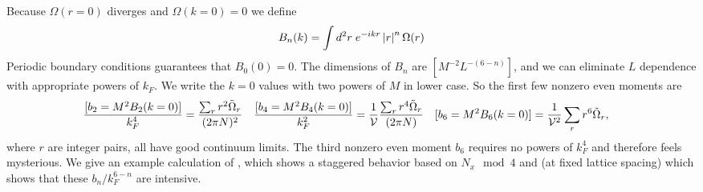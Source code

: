 Because $\Omega(r=0)$ diverges and $\Omega(k=0)=0$ we define
\begin{align}
	B_n(k) = \int d^2r\; e^{-i k r} \left| r \right|^n \Omega(r) 
\end{align}
Periodic boundary conditions guarantees that $B_0(0) = 0$.
The dimensions of $B_n$ are $[M^{-2} L^{-(6-n)}]$, and we can eliminate $L$ dependence with appropriate powers of $k_F$.
We write the $k=0$ values with two powers of $M$ in lower case.
So the first few nonzero even moments are
\begin{align}
	\frac{[b_2 = M^2 B_2(k=0)]}{k_F^4} &= \frac{\sum_r r^2 \tilde{\Omega}_r}{(2\pi N)^2}
	&
	\frac{[b_4 = M^2 B_4(k=0)]}{k_F^2} &= \frac{1}{\mathcal{V}} \frac{\sum_r r^4 \tilde{\Omega}_r}{(2\pi N)}
	&
	[b_6 = M^2 B_6(k=0)] &= \frac{1}{\mathcal{V}^2}\sum_r r^6 \tilde{\Omega}_r,
	\label{eq:voricity moments}
\end{align}
where $r$ are integer pairs, all have good continuum limits.
The third nonzero even moment $b_6$ requires no powers of $k_F^4$ and therefore feels mysterious.
We give an example calculation of , which shows a staggered behavior based on $N_x\mod{4}$ and  (at fixed lattice spacing) which shows that these $b_n/k_F^{6-n}$ are intensive.
